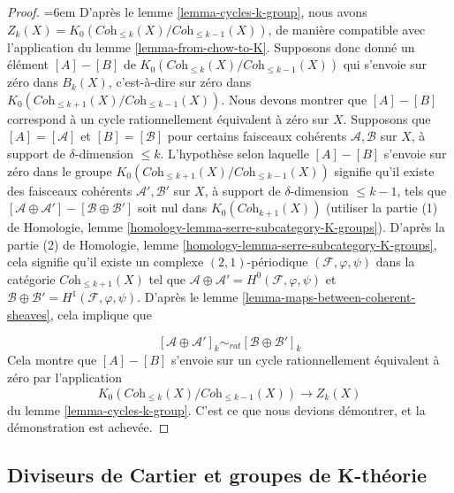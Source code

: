 \begin{proof}
{\emergencystretch=6em D'après le lemme \ref{lemma-cycles-k-group}, nous avons
$Z_k(X) = K_0(\textit{Coh}_{\leq k}(X)/\textit{Coh}_{\leq k - 1}(X))$,
de manière compatible avec l'application du lemme \ref{lemma-from-chow-to-K}.
Supposons donc donné un élément $[A] - [B]$ de
$K_0(\textit{Coh}_{\leq k}(X)/\textit{Coh}_{\leq k - 1}(X))$
qui s'envoie sur zéro dans $B_k(X)$, c'est-à-dire sur zéro dans
$K_0(\textit{Coh}_{\leq k + 1}(X)/\textit{Coh}_{\leq k - 1}(X))$.
Nous devons montrer que $[A] - [B]$ correspond à un cycle
rationnellement équivalent à zéro sur $X$.
Supposons que $[A] = [\mathcal{A}]$ et $[B] = [\mathcal{B}]$
pour certains faisceaux cohérents $\mathcal{A}, \mathcal{B}$ sur
$X$, à support de $\delta$-dimension $\leq k$.
L'hypothèse selon laquelle $[A] - [B]$ s'envoie sur zéro dans le groupe
$K_0(\textit{Coh}_{\leq k + 1}(X)/\textit{Coh}_{\leq k - 1}(X))$
signifie qu'il existe des faisceaux cohérents
$\mathcal{A}', \mathcal{B}'$ sur $X$, à support de
$\delta$-dimension $\leq k - 1$, tels que
$[\mathcal{A} \oplus \mathcal{A}'] - [\mathcal{B} \oplus \mathcal{B}']$
soit nul dans $K_0(\textit{Coh}_{k + 1}(X))$ (utiliser la partie (1) de
Homologie, lemme \ref{homology-lemma-serre-subcategory-K-groups}).
D'après la partie (2) de
Homologie, lemme \ref{homology-lemma-serre-subcategory-K-groups},
cela signifie qu'il existe un complexe $(2, 1)$-périodique
$(\mathcal{F}, \varphi, \psi)$ dans la catégorie $\textit{Coh}_{\leq k + 1}(X)$
tel que
$\mathcal{A} \oplus \mathcal{A}' = H^0(\mathcal{F}, \varphi, \psi)$
et $\mathcal{B} \oplus \mathcal{B}' = H^1(\mathcal{F}, \varphi, \psi)$.
D'après le lemme \ref{lemma-maps-between-coherent-sheaves},
cela implique que\par}
$$
[\mathcal{A} \oplus \mathcal{A}']_k
\sim_{rat}
[\mathcal{B} \oplus \mathcal{B}']_k
$$
Cela montre que $[A] - [B]$ s'envoie sur un cycle rationnellement
équivalent à zéro par l'application
$$
K_0(\textit{Coh}_{\leq k}(X)/\textit{Coh}_{\leq k - 1}(X))
\longrightarrow Z_k(X)
$$
du lemme \ref{lemma-cycles-k-group}. C'est ce que nous
devions démontrer, et la démonstration est achevée.
\end{proof}














\subsection{Diviseurs de Cartier et groupes de K-théorie}
\label{subsection-cartier-coherent}

